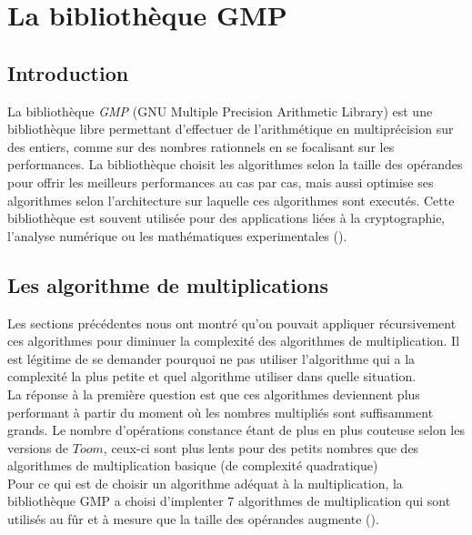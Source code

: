 \documentclass[letterpaper]{article}
\begin{document}


\section{La bibliothèque GMP}

\subsection{Introduction}

La bibliothèque \emph{GMP} (GNU Multiple Precision Arithmetic Library) est une
bibliothèque libre permettant d'effectuer de l'arithmétique en multiprécision sur
des entiers, comme sur des nombres rationnels en se focalisant sur les
performances. La bibliothèque choisit les algorithmes selon la taille des
opérandes pour offrir les meilleurs performances au cas par cas, mais aussi
optimise ses algorithmes selon l'architecture sur laquelle ces algorithmes sont
executés.
\newline
Cette bibliothèque est souvent utilisée pour des applications liées à la
cryptographie, l'analyse numérique ou les mathématiques experimentales
(\cite{wikigmp}).

\subsection{Les algorithme de multiplications}

Les sections précédentes nous ont montré qu'on pouvait appliquer récursivement
ces algorithmes pour diminuer la complexité des algorithmes de multiplication.
Il est légitime de se demander pourquoi ne pas utiliser l'algorithme
qui a la complexité la plus petite et quel algorithme utiliser dans
quelle situation.\\

La réponse à la première question est que ces algorithmes deviennent
plus performant à partir du moment où les nombres multipliés sont
suffisamment grands. Le nombre d'opérations constance étant de plus en plus
couteuse selon les versions de $Toom$, ceux-ci sont plus lents pour des petits
nombres que des algorithmes de multiplication basique (de complexité
quadratique)\\

Pour ce qui est de choisir un algorithme adéquat à la multiplication,
la bibliothèque GMP a choisi d'implenter 7 algorithmes de multiplication
qui sont utilisés au fûr et à mesure que la taille des opérandes
augmente (\cite{gmplibmultiplication}).
\end{document}

